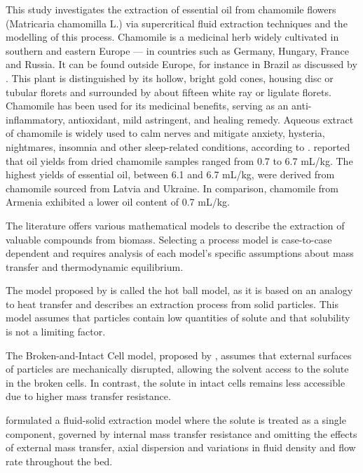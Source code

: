 \documentclass[a4paper,fleqn]{cas-dc}
\begin{document}

This study investigates the extraction of essential oil from chamomile flowers (Matricaria chamomilla L.) via supercritical fluid extraction techniques and the modelling of this process. Chamomile is a medicinal herb widely cultivated in southern and eastern Europe — in countries such as Germany, Hungary, France and Russia. It can be found outside Europe, for instance in Brazil as discussed by \citet{Singh2011}. This plant is distinguished by its hollow, bright gold cones, housing disc or tubular florets and surrounded by about fifteen white ray or ligulate florets. Chamomile has been used for its medicinal benefits, serving as an anti-inflammatory, antioxidant, mild astringent, and healing remedy. Aqueous extract of chamomile is widely used to calm nerves and mitigate anxiety, hysteria, nightmares, insomnia and other sleep-related conditions, according to \citet{Srivastava2009}. \citet{Orav2010} reported that oil yields from dried chamomile samples ranged from 0.7 to 6.7 mL/kg. The highest yields of essential oil, between 6.1 and 6.7 mL/kg, were derived from chamomile sourced from Latvia and Ukraine. In comparison, chamomile from Armenia exhibited a lower oil content of 0.7 mL/kg.

The literature offers various mathematical models to describe the extraction of valuable compounds from biomass. Selecting a process model is case-to-case dependent and requires analysis of each model's specific assumptions about mass transfer and thermodynamic equilibrium.

The model proposed by \citet{Reverchon1993} is called the hot ball model, as it is based on an analogy to heat transfer and describes an extraction process from solid particles. This model assumes that particles contain low quantities of solute and that solubility is not a limiting factor.

The Broken-and-Intact Cell model, proposed by \citet{Sovova1994}, assumes that external surfaces of particles are mechanically disrupted, allowing the solvent access to the solute in the broken cells. In contrast, the solute in intact cells remains less accessible due to higher mass transfer resistance.

\citet{Reverchon1996} formulated a fluid-solid extraction model where the solute is treated as a single component, governed by internal mass transfer resistance and omitting the effects of external mass transfer, axial dispersion and variations in fluid density and flow rate throughout the bed.
\end{document}
